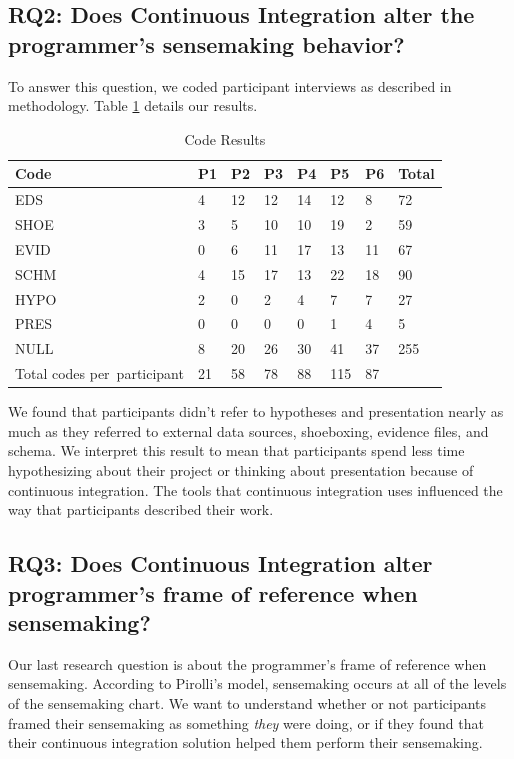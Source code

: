 \documentclass{sig-alternate}
\begin{document}
\subsection{RQ2: Does Continuous Integration alter the programmer's sensemaking behavior?}
To answer this question, we coded participant interviews as described in methodology. Table \ref{table:coderesults} details our results. 
\begin{table}
\centering
\caption{Code Results}
\label{table:coderesults}
\begin{tabular}{ | >{\centering\arraybackslash}p{} | m{0.4cm} | l | l | l | l | l | l | }
	\hline
	\rowcolor{black!20!}Code & P1 & P2 & P3 & P4 & P5 & P6 & Total \\ \hline
	EDS & 4 & 12 & 12 & 14 & 12 & 8 & 72 \\ \hline
	SHOE & 3 & 5 & 10 & 10 & 19 & 2 & 59 \\ \hline
	EVID & 0 & 6 & 11 & 17 & 13 & 11 & 67 \\ \hline
	SCHM & 4 & 15 & 17 & 13 & 22 & 18 & 90 \\ \hline
	HYPO & 2 & 0 & 2 & 4 & 7 & 7 & 27 \\ \hline
	PRES & 0 & 0 & 0 & 0 & 1 & 4 & 5 \\ \hline
	NULL & 8 & 20 & 26 & 30 & 41 & 37 & 255 \\ \hline
	\rowcolor{black!20!}Total codes \mbox{per participant} & 21 & 58 & 78 & 88 & 115 & 87 &  \\ \hline
\end{tabular}
\end{table}

We found that participants didn't refer to hypotheses and presentation nearly as much as they referred to external data sources, shoeboxing, evidence files, and schema. We interpret this result to mean that participants spend less time hypothesizing about their project or thinking about presentation because of continuous integration. The tools that continuous integration uses influenced the way that participants described their work.

\subsection{RQ3: Does Continuous Integration alter programmer's frame of reference when sensemaking?}
Our last research question is about the programmer's frame of reference when sensemaking. According to Pirolli's model, sensemaking occurs at all of the levels of the sensemaking chart. We want to understand whether or not participants framed their sensemaking as something \textit{they} were doing, or if they found that their continuous integration solution helped them perform their sensemaking.
\end{document}

